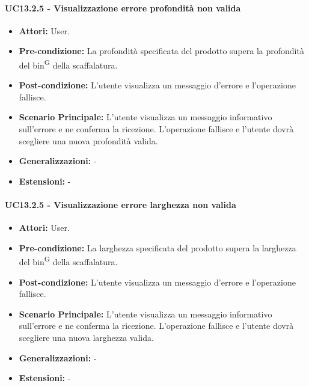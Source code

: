 \paragraph{UC13.2.5 - Visualizzazione errore profondità non valida}
\begin{itemize}
    \item \textbf{Attori:} User.
    \item \textbf{Pre-condizione:} La profondità specificata del prodotto supera la profondità del bin\textsuperscript{G} della scaffalatura.
    \item \textbf{Post-condizione:} L'utente visualizza un messaggio d'errore e l'operazione fallisce.
    \item \textbf{Scenario Principale:}  L'utente visualizza un messaggio informativo sull'errore e ne conferma la ricezione. L'operazione fallisce e l'utente dovrà scegliere una nuova profondità valida.
    \item \textbf{Generalizzazioni:} -
    \item \textbf{Estensioni:} -
\end{itemize}


\paragraph{UC13.2.5 - Visualizzazione errore larghezza non valida}
\begin{itemize}
    \item \textbf{Attori:} User.
    \item \textbf{Pre-condizione:}  La larghezza specificata del prodotto supera la larghezza del bin\textsuperscript{G} della scaffalatura.
    \item \textbf{Post-condizione:} L'utente visualizza un messaggio d'errore e l'operazione fallisce.
    \item \textbf{Scenario Principale:}  L'utente visualizza un messaggio informativo sull'errore e ne conferma la ricezione. L'operazione fallisce e l'utente dovrà scegliere una nuova larghezza valida.
    \item \textbf{Generalizzazioni:} -
    \item \textbf{Estensioni:} -
\end{itemize}


